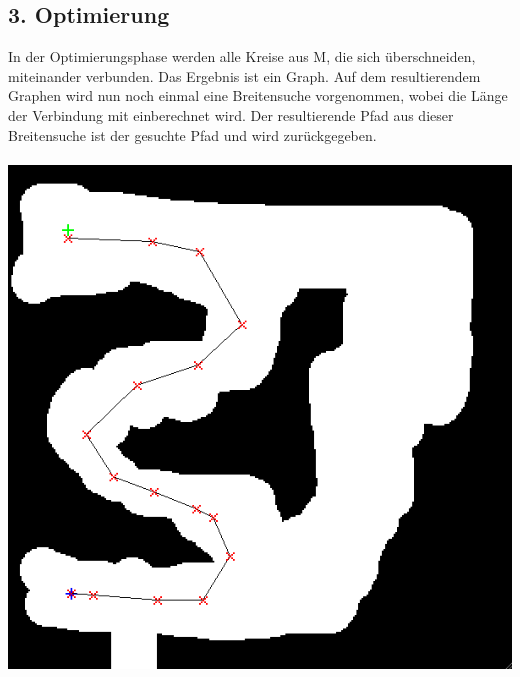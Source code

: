 \documentclass[11pt,a4paper,oneside,onecolumn]{scrartcl}
\begin{document}
\subsection*{3. Optimierung}
	In der Optimierungsphase werden alle Kreise aus M, die sich überschneiden, miteinander verbunden. Das Ergebnis ist ein Graph. Auf dem resultierendem Graphen wird nun noch einmal eine Breitensuche vorgenommen, wobei die Länge der Verbindung mit einberechnet wird. Der resultierende Pfad aus dieser Breitensuche ist der gesuchte Pfad und wird zurückgegeben. \\
	\\
	\includegraphics[scale=0.45]{p5.png} 
\end{document}
